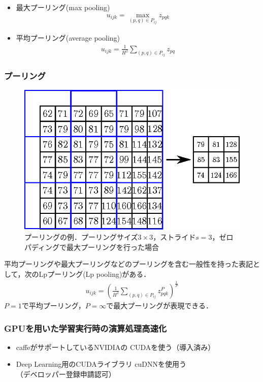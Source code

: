\documentclass[dvipdfmx,11pt,notheorems]{beamer}
\theoremstyle{definition}
\begin{document}
\begin{frame}[fragile]
\begin{frame}[fragile]
\begin{itemize}
 \item 最大プーリング(max pooling) 
	   \begin{eqnarray}
		u_{ijk} = \max_{(p,q) \in P_{ij}} z_{pqk}	
	   \end{eqnarray}
 \item 平均プーリング(average pooling) 
	   \begin{eqnarray}
		u_{ijk} = \frac{1}{H^{2}}\sum_{(p,q) \in P_{ij}} z_{pq} 
	   \end{eqnarray}

\end{itemize}

\end{frame}

\begin{frame}[fragile]\frametitle{プーリング}
\begin{figure}[bt]
 \centering
 \includegraphics[scale = 0.6]{fig/eps/pooling.eps}
 \caption{プーリングの例．プーリングサイズ$3\times 3$，ストライド$s=3$，ゼロパディングで最大プーリングを行った場合}
\end{figure}
平均プーリングや最大プーリングなどのプーリングを含む一般性を持った表記として，次のLpプーリング(Lp pooling)がある．
\begin{eqnarray}
 u_{ijk} = \left(\frac{1}{H^{2}}\sum_{(p,q) \in P_{ij}}z^{P}_{pqk}\right)^{\frac{1}{P}}
\end{eqnarray}
$P=1$で平均プーリング，$P=\infty$で最大プーリングが表現できる．

\end{frame}


\begin{frame}\frametitle{GPUを用いた学習実行時の演算処理高速化}
\begin{itemize}
\item caffeがサポートしているNVIDIAの{\color{orange} CUDA}を使う（導入済み）
\item Deep Learning用のCUDAライブラリ{\color{orange} cuDNN}を使用う\\（デベロッパー登録申請認可）
\end{itemize}


\end{frame}
\end{frame}
\end{document}
